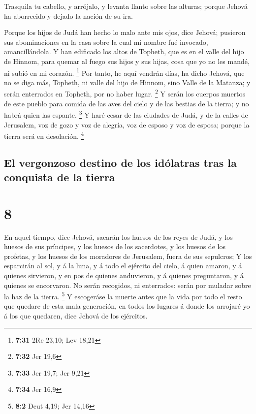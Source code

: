  Trasquila tu cabello, y arrójalo, y levanta llanto sobre
las alturas; porque Jehová ha aborrecido y dejado la nación de su ira.

 Porque los hijos de Judá han hecho lo malo ante mis ojos,
dice Jehová; pusieron sus abominaciones en la casa sobre la cual mi
nombre fué invocado, amancillándola.  Y han edificado los
altos de Topheth, que es en el valle del hijo de Hinnom, para quemar al
fuego sus hijos y sus hijas, cosa que yo no les mandé, ni subió en mi
corazón. \footnote{\textbf{7:31} 2Re 23,10; Lev 18,21}  Por
tanto, he aquí vendrán días, ha dicho Jehová, que no se diga más,
Topheth, ni valle del hijo de Hinnom, sino Valle de la Matanza; y serán
enterrados en Topheth, por no haber lugar. \footnote{\textbf{7:32} Jer
  19,6}  Y serán los cuerpos muertos de este pueblo para
comida de las aves del cielo y de las bestias de la tierra; y no habrá
quien las espante. \footnote{\textbf{7:33} Jer 19,7; Jer 9,21}
 Y haré cesar de las ciudades de Judá, y de la calles de
Jerusalem, voz de gozo y voz de alegría, voz de esposo y voz de esposa;
porque la tierra será en desolación. \footnote{\textbf{7:34} Jer 16,9}

\hypertarget{el-vergonzoso-destino-de-los-iduxf3latras-tras-la-conquista-de-la-tierra}{%
\subsection{El vergonzoso destino de los idólatras tras la conquista de
la
tierra}\label{el-vergonzoso-destino-de-los-iduxf3latras-tras-la-conquista-de-la-tierra}}

\hypertarget{section-7}{%
\section{8}\label{section-7}}

 En aquel tiempo, dice Jehová, sacarán los huesos de los
reyes de Judá, y los huesos de sus príncipes, y los huesos de los
sacerdotes, y los huesos de los profetas, y los huesos de los moradores
de Jerusalem, fuera de sus sepulcros;  Y los esparcirán al
sol, y á la luna, y á todo el ejército del cielo, á quien amaron, y á
quienes sirvieron, y en pos de quienes anduvieron, y á quienes
preguntaron, y á quienes se encorvaron. No serán recogidos, ni
enterrados: serán por muladar sobre la haz de la tierra. \footnote{\textbf{8:2}
  Deut 4,19; Jer 14,16}  Y escogeráse la muerte antes que la
vida por todo el resto que quedare de esta mala generación, en todos los
lugares á donde los arrojaré yo á los que quedaren, dice Jehová de los
ejércitos.

